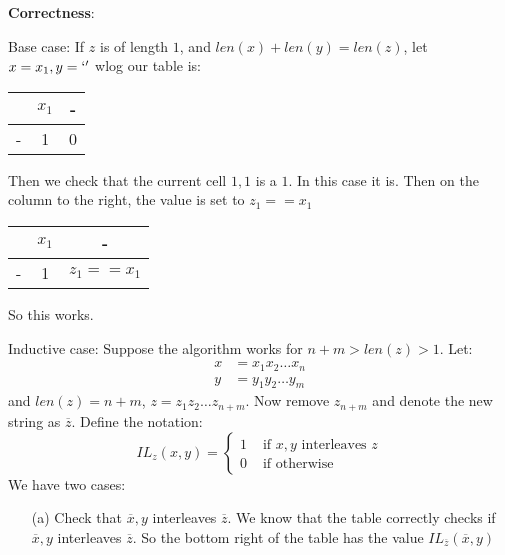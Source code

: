 \documentclass{article}
\begin{document}
\begin{itemize}
\begin{answer}
                \textbf{Correctness}: 

                Base case: If $z$ is of length $1$, and $len(x) + len(y) = len(z)$, let $x = x_{1}, y = `'$ wlog our table is:
                    \begin{center}
                        \begin{tabular}{ c c c }
                            \hline   & $x_{1}$ & - \\
                            \hline - & 1 & 0   
                        \end{tabular}
                    \end{center}
                Then we check that the current cell $1, 1$ is a $1$. In this case it is. Then on the column to the right, the value is set to $z_{1} == x_{1}$
                    \begin{center}
                        \begin{tabular}{ c c c }
                            \hline   & $x_{1}$ & - \\
                            \hline - & 1 & $z_{1} == x_{1}$ 
                        \end{tabular}
                    \end{center}
                So this works.

                Inductive case: Suppose the algorithm works for $n + m > len(z) > 1$. Let:
                    \begin{align*}
                        x &= x_{1}x_{2}\ldots x_{n} \\
                        y &= y_{1}y_{2}\ldots y_{m}   
                    \end{align*}
                and $len(z) = n + m$, $z = z_{1}z_{2} \ldots z_{n + m}$. Now remove $z_{n + m}$ and denote the new string as $\overline{z}$. Define the notation:
                    \begin{equation*}
                        IL_{z}(x, y) = \begin{cases}
                            1                &\text{ if } \text{$x, y$ interleaves $z$} \\
                            0 &\text{ if } \text{otherwise}   
                        \end{cases}
                    \end{equation*}
                We have two cases:
                    \begin{itemize}
                        \item [(a)] Check that $\overline{x}, y$ interleaves $\overline{z}$. We know that the table correctly checks if $\overline{x}, y$ interleaves $\overline{z}$. So the bottom right of the table has the value $IL_{\overline{z}}(\overline{x}, y)$


\end{itemize}
\end{answer}
\end{itemize}
\end{document}
